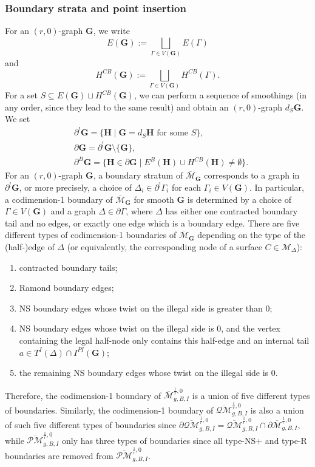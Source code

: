 \documentclass[11pt]{amsart}
\theoremstyle{definition}
\theoremstyle{remark}
\newcommand{\oPMb}{{\overline{\mathcal{PM}}}}
\newcommand{\oQMb}{{\overline{\mathcal{QM}}}}
\newcommand{\<}{\left<}
\renewcommand{\>}{\right>}
\numberwithin{equation}{section}
\def\Mbar{{\overline{\mathcal M}}}
\begin{document}
\subsubsection{Boundary strata and point insertion}
For an $(r,0)$-graph $\bm{G}$, 
we write
$$
E(\bm{G}):=\bigsqcup_{\Gamma\in V(\bm{G})} E(\Gamma)
$$
and 
$$
H^{CB}(\bm{G}):= \bigsqcup_{\Gamma\in V(\bm{G})}  H^{CB}(\Gamma).
$$
For a set 
$S\subseteq E(\bm{G})\sqcup H^{CB}(\bm{G})$, 
we can perform a sequence of smoothings (in any order, since they lead to the same result) and obtain an $(r,0)$-graph $d_S \bm{G}$.  We set
\begin{align*}
&\partial^!\bm{G} = \{\bm{H} \; | \; \bm{G} = d_S\bm{H} \text{ for some } S\},\\
&\partial \bm{G} = \partial^!\bm{G} \setminus \{\bm{G}\},\\
&\partial^B \bm{G} = \{\bm{H} \in \partial \bm{G} \; | \; E^B(\bm{H}) \cup H^{CB}(\bm{H}) \neq \emptyset\}.
\end{align*}
For an $(r,0)$-graph $\mathbf{G}$, a boundary stratum of $\Mbar_\mathbf{G}$ corresponds to a graph in $\partial^!\mathbf{G}$, or more precisely, a choice of $\Delta_i\in \partial^! \Gamma_{i}$ for each $\Gamma_i\in V(\mathbf{G})$. In particular, a codimension-1 boundary of $\Mbar_\mathbf{G}$ for smooth $\mathbf{G}$ is determined by a choice of $\Gamma\in V(\mathbf{G})$ and a graph $\Delta \in \partial \Gamma$, where $\Delta$ has either one contracted boundary tail and no edges, or exactly one edge which is a boundary edge. There are five different types of codimension-1 boundaries of $\Mbar_\mathbf{G}$ depending on the type of the (half-)edge of $\Delta$ (or equivalently, the corresponding node of a surface $C\in \mathcal M_\Delta$): 



\begin{enumerate}
    \item[{CB}] contracted boundary %
tails;
    \item[{R}] Ramond %
boundary edges;
    \item[{NS+}] NS boundary edges whose twist on the illegal side is greater than $0$;
    \item[AI] NS boundary edges whose twist on the illegal side is $0$, and the vertex containing the legal half-node only contains this half-edge and an internal tail $a\in T^I(\Delta)\cap I^{PI}(\mathbf{G})$;
    \item[BI] the remaining NS boundary edges whose twist on the illegal side is $0$.
\end{enumerate}
Therefore, the codimension-1 boundary of $\Mbar^{\frac{1}{r},0}_{g,B,I}$ is a union of five different types of boundaries. Similarly, the codimension-1 boundary of $\oQMb^{\frac{1}{r},0}_{g,B,I}$ is also a union of such five different types of boundaries since $\partial \oQMb^{\frac{1}{r},0}_{g,B,I}=\oQMb^{\frac{1}{r},0}_{g,B,I}\cap  \partial \Mbar^{\frac{1}{r},0}_{g,B,I}$, while $\oPMb^{\frac{1}{r},0}_{g,B,I}$ only has three types of boundaries since all type-NS+ and type-R boundaries are removed from $\oPMb^{\frac{1}{r},0}_{g,B,I}$. 
\end{document}
